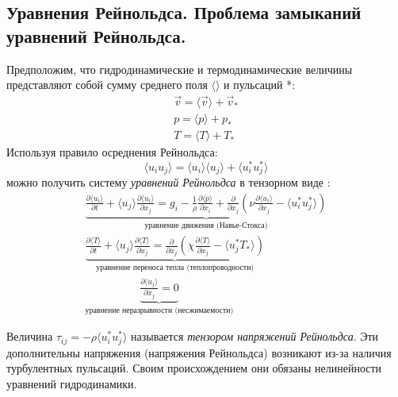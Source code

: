 \subsection{Уравнения Рейнольдса. Проблема замыканий уравнений Рейнольдса.}\label{q4-3}
Предположим, что гидродинамические и термодинамические величины представляют собой сумму среднего поля $\langle\rangle$ и пульсаций *:
\begin{equation}
\begin{gathered}
\vec{v}=\langle\vec{v}\rangle+\vec{v}_{*}
\\
p=\langle p\rangle+p_{*}
\\
T=\langle T\rangle+T_{*}
\end{gathered}
\end{equation}
Используя правило осреднения Рейнольдса:
\begin{equation}
\langle u_i u_j\rangle=\langle u_i\rangle\langle u_j\rangle+\langle u_i^* u_j^*\rangle
\end{equation}
можно получить систему \textit{уравнений Рейнольдса} в тензорном виде \cite{Носов-2013}:
\begin{equation}\label{eq-4-3-3}
\begin{gathered}
\underbrace{\frac{\partial \langle u_i\rangle}{\partial t}+\langle u_j\rangle\frac{\partial \langle u_i\rangle}{\partial x_j}=g_i-\frac{1}{\rho}\frac{\partial \langle p\rangle}{\partial x_i}+\frac{\partial}{\partial x_j}\left(\nu\frac{\partial \langle u_i\rangle}{\partial x_j}-\langle u_i^* u_j^*\rangle\right)}_\text{уравнение движения (Навье-Стокса)}
\\
\underbrace{\frac{\partial \langle T\rangle}{\partial t}+\langle u_j\rangle\frac{\partial \langle T\rangle}{\partial x_j}=\frac{\partial}{\partial x_j}\left(\chi\frac{\partial\langle T\rangle}{\partial x_j}-\langle u_j^*T_*\rangle\right)}_\text{уравнение переноса тепла (теплопроводности)}
\\
\underbrace{\frac{\partial \langle u_j\rangle}{\partial x_j}=0}_\text{уравнение неразрывности (несжимаемости)}
\end{gathered}
\end{equation}

Величина $\tau_{ij}=-\rho\langle u_i^* u_j^*\rangle$  называется \textit{тензором напряжений Рейнольдса}.
Эти дополнительны напряжения (напряжения Рейнольдса) возникают из-за наличия турбулентных пульсаций.
Своим происхождением они обязаны нелинейности уравнений гидродинамики.


